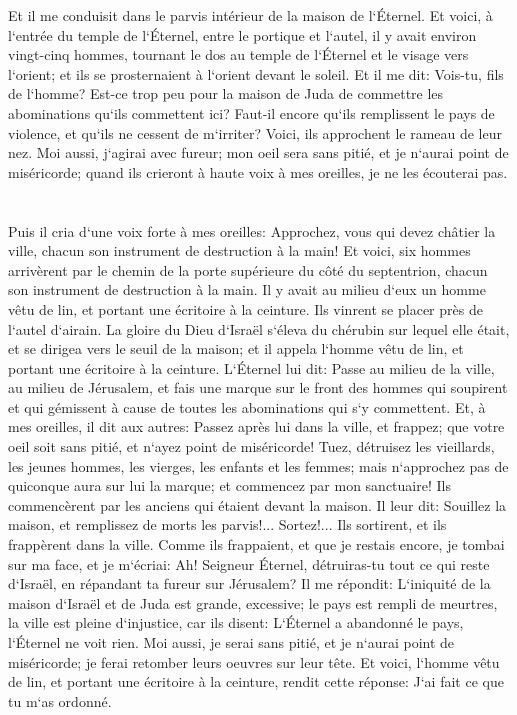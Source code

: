 \verse Et il me conduisit dans le parvis intérieur de la maison de l`Éternel. Et voici, à l`entrée du temple de l`Éternel, entre le portique et l`autel, il y avait environ vingt-cinq hommes, tournant le dos au temple de l`Éternel et le visage vers l`orient; et ils se prosternaient à l`orient devant le soleil. 
\verse Et il me dit: Vois-tu, fils de l`homme? Est-ce trop peu pour la maison de Juda de commettre les abominations qu`ils commettent ici? Faut-il encore qu`ils remplissent le pays de violence, et qu`ils ne cessent de m`irriter? Voici, ils approchent le rameau de leur nez. 
\verse Moi aussi, j`agirai avec fureur; mon oeil sera sans pitié, et je n`aurai point de miséricorde; quand ils crieront à haute voix à mes oreilles, je ne les écouterai pas. 

\chapter{}

\verse Puis il cria d`une voix forte à mes oreilles: Approchez, vous qui devez châtier la ville, chacun son instrument de destruction à la main! 
\verse Et voici, six hommes arrivèrent par le chemin de la porte supérieure du côté du septentrion, chacun son instrument de destruction à la main. Il y avait au milieu d`eux un homme vêtu de lin, et portant une écritoire à la ceinture. Ils vinrent se placer près de l`autel d`airain. 
\verse La gloire du Dieu d`Israël s`éleva du chérubin sur lequel elle était, et se dirigea vers le seuil de la maison; et il appela l`homme vêtu de lin, et portant une écritoire à la ceinture. 
\verse L`Éternel lui dit: Passe au milieu de la ville, au milieu de Jérusalem, et fais une marque sur le front des hommes qui soupirent et qui gémissent à cause de toutes les abominations qui s`y commettent. 
\verse Et, à mes oreilles, il dit aux autres: Passez après lui dans la ville, et frappez; que votre oeil soit sans pitié, et n`ayez point de miséricorde! 
\verse Tuez, détruisez les vieillards, les jeunes hommes, les vierges, les enfants et les femmes; mais n`approchez pas de quiconque aura sur lui la marque; et commencez par mon sanctuaire! Ils commencèrent par les anciens qui étaient devant la maison. 
\verse Il leur dit: Souillez la maison, et remplissez de morts les parvis!... Sortez!... Ils sortirent, et ils frappèrent dans la ville. 
\verse Comme ils frappaient, et que je restais encore, je tombai sur ma face, et je m`écriai: Ah! Seigneur Éternel, détruiras-tu tout ce qui reste d`Israël, en répandant ta fureur sur Jérusalem? 
\verse Il me répondit: L`iniquité de la maison d`Israël et de Juda est grande, excessive; le pays est rempli de meurtres, la ville est pleine d`injustice, car ils disent: L`Éternel a abandonné le pays, l`Éternel ne voit rien. 
\verse Moi aussi, je serai sans pitié, et je n`aurai point de miséricorde; je ferai retomber leurs oeuvres sur leur tête. 
\verse Et voici, l`homme vêtu de lin, et portant une écritoire à la ceinture, rendit cette réponse: J`ai fait ce que tu m`as ordonné. 


